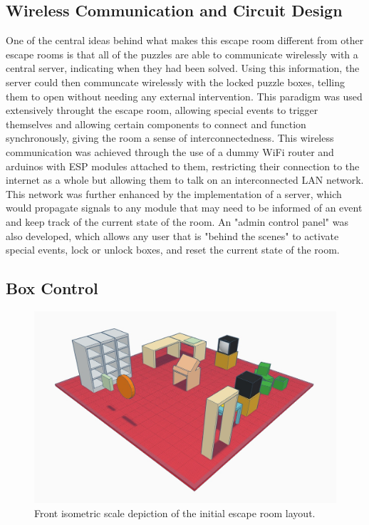 \documentclass[conference]{IEEEtran}
\begin{document}
\subsection{Wireless Communication and Circuit Design} %
One of the central ideas behind what makes this escape room different from other escape rooms is that all of the puzzles are able to communicate
wirelessly with a central server, indicating when they had been solved. Using this information, the server could then communcate wirelessly with
the locked puzzle boxes, telling them to open without needing any external intervention. This paradigm was used extensively throught the escape
room, allowing special events to trigger themselves and allowing certain components to connect and function synchronously, giving the room a 
sense of interconnectedness. This wireless communication was achieved through the use of a dummy WiFi router and arduinos with ESP modules
attached to them, restricting their connection to the internet as a whole but allowing them to talk on an interconnected LAN network.
\\
\indent This network was further enhanced by the implementation of a server, which would propagate signals to any module that may need to be informed
of an event and keep track of the current state of the room. An "admin control panel" was also developed, which allows any user that is "behind the
scenes" to activate special events, lock or unlock boxes, and reset the current state of the room.


\subsection{Box Control}

\begin{figure}[ht]
    \centering
    \includegraphics[width=0.90\columnwidth]{Images/EscapeRoomIsoFront.jpg}
    \caption{Front isometric scale depiction of the initial escape room layout.}
\end{figure}
\end{document}
